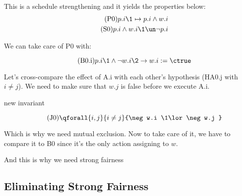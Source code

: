 This is a schedule strengthening and it yields the properties below:
\begin{align}
	\tag{P0}
	p.i \1\mapsto p.i \land w.i \\
	\tag{S0}
	p.i \land w.i \1\un \neg p.i
\end{align}

We can take care of P0 with:

\[ \tag{B0.i} p.i \1\land \neg w.i \2\rightarrow w.i := \ctrue \]


Let's cross-compare the effect of A.i with each other's hypothesis (HA0.j with $i \neq j$).  We need to make sure that $w.j$ is false before we execute A.i.

new invariant

\[ \tag{J0} \qforall{i,j}{i \neq j}{\neg w.i \1\lor \neg w.j }  \]

Which is why we need mutual exclusion.  Now to take care of it, we have to compare it to B0 since it's the only action assigning to $w$.


And this is why we need strong fairness

\subsection{Eliminating Strong Fairness}


